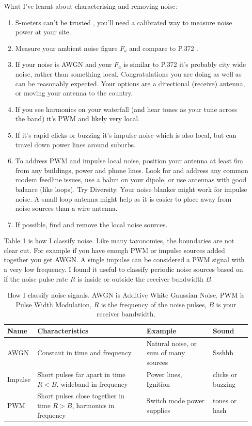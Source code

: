 \documentclass{article}
\begin{document}
What I've learnt about characterising and removing noise:
\begin{enumerate}
\item S-meters can't be trusted \cite{vu2nsb_s_meter}\cite{dj0ip_s_meter}, you'll need a calibrated way to measure noise power at your site.
\item Measure your ambient noise figure $F_a$ and compare to P.372 \cite{itu372-16}.
\item If your noise is AWGN and your $F_a$ is similar to P.372 it's probably city wide noise, rather than something local. Congratulations you are doing as well as can be reasonably expected. Your options are a directional (receive) antenna, or moving your antenna to the country.
\item If you see harmonics on your waterfall (and hear tones as your tune across the band) it's PWM and likely very local.
\item If it's rapid clicks or buzzing it's impulse noise which is also local, but can travel down power lines around suburbs. 
\item To address PWM and impulse local noise, position your antenna at least 6m from any buildings, power and phone lines.  Look for and address any common modem feedline issues, use a balun on your dipole, or use antennas with good balance (like loops).  Try Diversity.  Your noise blanker might work for impulse noise.  A small loop antenna might help as it is easier to place away from noise sources than a wire antenna.
\item If possible, find and remove the local noise sources.
\end{enumerate}

Table \ref{table:noise_classes} is how I classify noise.  Like many taxonomies, the boundaries are not clear cut.  For example if you have enough PWM or impulse sources added together you get AWGN.  A single impulse can be considered a PWM signal with a very low frequency.  I found it useful to classify periodic noise sources based on if the noise pulse rate $R$ is inside or outside the receiver bandwidth $B$.
\begin{table}[h]
\centering
\begin{tabular}{ | m{1.2cm} | m{4cm} | m{3cm} | m{2cm} |}
 \hline\hline
 Name & Characteristics & Example & Sound \\
 \hline
 AWGN & Constant in time and frequency & Natural noise, or sum of many sources & Ssshhh \\
 \hline
 Impulse & Short pulses far apart in time $R<B$, wideband in frequency & Power lines, Ignition & clicks or buzzing \\
\hline PWM & Short pulses close together in time $R>B$, harmonics in frequency & Switch mode power supplies & tones or hash \\
 \hline
\end{tabular}
\caption{How I classify noise signals. AWGN is Additive White Gaussian Noise, PWM is Pulse Width Modulation, $R$ is the frequency of the noise pulses, $B$ is your receiver bandwidth.}
\label{table:noise_classes}
\end{table}
\end{document}
